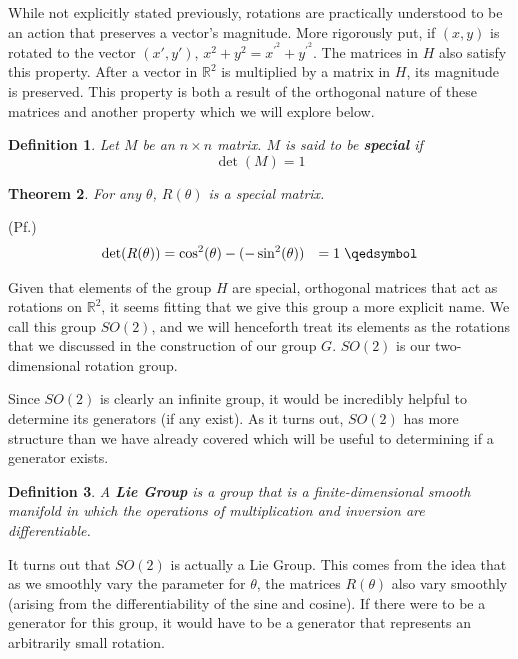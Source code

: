 \documentclass[10pt]{ucthesis}
\newcommand{\R}{\mathbb{R}}
\newtheorem{definition}{Definition}[chapter]
\newtheorem{theorem}[definition]{Theorem}
\begin{document}
While not explicitly stated previously, rotations are practically understood to be an action that preserves a vector's magnitude. More rigorously put, if $(x,y)$ is rotated to the vector $(x',y')$, $x^2+y^2 = x^{\prime^2}+y^{\prime^2}$. The matrices in $H$ also satisfy this property. After a vector in $\R^2$ is multiplied by a matrix in $H$, its magnitude is preserved. This property is both a result of the orthogonal nature of these matrices and another property which we will explore below.

\begin{definition}
	Let $M$ be an $n\times n$ matrix. $M$ is said to be \textbf{special} if $$\det(M)=1$$
\end{definition}

\begin{theorem}
	For any $\theta$, $R(\theta)$ is a special matrix.
\end{theorem}
\noindent(Pf.)
\begin{equation}
	\begin{aligned}
		\det(R(\theta)) &= \cos^2(\theta) - (-\sin^2(\theta)) &= 1 \hspace{1mm} \qedsymbol
	\end{aligned}
\end{equation}

Given that elements of the group $H$ are special, orthogonal matrices that act as rotations on $\R^2$, it seems fitting that we give this group a more explicit name. We call this group $SO(2)$, and we will henceforth treat its elements as the rotations that we discussed in the construction of our group $G$. $SO(2)$ is our two-dimensional rotation group.

Since $SO(2)$ is clearly an infinite group, it would be incredibly helpful to determine its generators (if any exist). As it turns out, $SO(2)$ has more structure than we have already covered which will be useful to determining if a generator exists.

\begin{definition}
	A \textbf{Lie Group} is a group that is a finite-dimensional smooth manifold in which the operations of multiplication and inversion are differentiable.
\end{definition}

It turns out that $SO(2)$ is actually a Lie Group. This comes from the idea that as we smoothly vary the parameter for $\theta$, the matrices $R(\theta)$ also vary smoothly (arising from the differentiability of the sine and cosine). If there were to be a generator for this group, it would have to be a generator that represents an arbitrarily small rotation.
\end{document}
